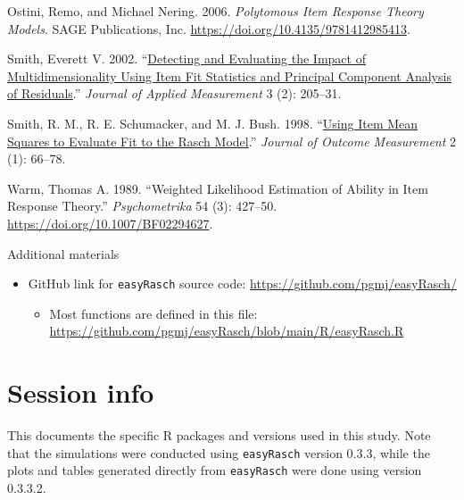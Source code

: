 \documentclass[
  letterpaper,
  DIV=11,
  numbers=noendperiod]{scrartcl}
\providecommand{\tightlist}{%
  \setlength{\itemsep}{0pt}\setlength{\parskip}{0pt}}\usepackage{longtable,booktabs,array}
\newlength{\cslhangindent}
\newenvironment{CSLReferences}[2] %
 {\begin{list}{}{%
  \setlength{\itemindent}{0pt}
  \setlength{\leftmargin}{0pt}
  \setlength{\parsep}{0pt}
  \ifodd #1
   \setlength{\leftmargin}{\cslhangindent}
   \setlength{\itemindent}{-1\cslhangindent}
  \fi
  \setlength{\itemsep}{#2\baselineskip}}}
 {\end{list}}
\begin{document}
\begin{CSLReferences}{1}{0}
Ostini, Remo, and Michael Nering. 2006. \emph{Polytomous {Item}
{Response} {Theory} {Models}}. SAGE Publications, Inc.
\url{https://doi.org/10.4135/9781412985413}.

Smith, Everett V. 2002.
{``\href{https://www.ncbi.nlm.nih.gov/pubmed/12011501}{Detecting and
Evaluating the Impact of Multidimensionality Using Item Fit Statistics
and Principal Component Analysis of Residuals}.''} \emph{Journal of
Applied Measurement} 3 (2): 205--31.

Smith, R. M., R. E. Schumacker, and M. J. Bush. 1998.
{``\href{https://www.ncbi.nlm.nih.gov/pubmed/9661732}{Using Item Mean
Squares to Evaluate Fit to the {Rasch} Model}.''} \emph{Journal of
Outcome Measurement} 2 (1): 66--78.

Warm, Thomas A. 1989. {``Weighted Likelihood Estimation of Ability in
Item Response Theory.''} \emph{Psychometrika} 54 (3): 427--50.
\url{https://doi.org/10.1007/BF02294627}.

\end{CSLReferences}

Additional materials

\begin{itemize}
\tightlist
\item
  GitHub link for \texttt{easyRasch} source code:
  \url{https://github.com/pgmj/easyRasch/}

  \begin{itemize}
  \tightlist
  \item
    Most functions are defined in this file:
    \url{https://github.com/pgmj/easyRasch/blob/main/R/easyRasch.R}
  \end{itemize}
\end{itemize}

\section{Session info}\label{session-info}

This documents the specific R packages and versions used in this study.
Note that the simulations were conducted using \texttt{easyRasch}
version 0.3.3, while the plots and tables generated directly from
\texttt{easyRasch} were done using version 0.3.3.2.
\end{document}
